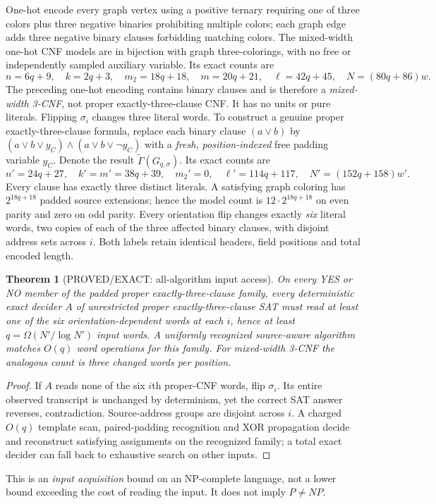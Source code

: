 \documentclass[11pt]{article}
\newtheorem{theorem}{Theorem}
\begin{document}
One-hot encode every graph vertex using a positive ternary requiring one of three colors plus three negative binaries prohibiting multiple colors; each graph edge adds three negative binary clauses forbidding matching colors. The mixed-width one-hot CNF models are in bijection with graph three-colorings, with no free or independently sampled auxiliary variable. Its exact counts are
\[
n=6q+9,\quad k=2q+3,\quad m_2=18q+18,\quad
m=20q+21,\quad \ell=42q+45,\quad N=(80q+86)w.
\]
The preceding one-hot encoding contains binary clauses and is therefore a
\emph{mixed-width 3-CNF}, not proper exactly-three-clause CNF. It has no
units or pure literals. Flipping $\sigma_i$ changes three literal words.
To construct a genuine proper exactly-three-clause formula, replace each
binary clause $(a\vee b)$ by $(a\vee b\vee y_C)\wedge
(a\vee b\vee\neg y_C)$ with a \emph{fresh, position-indexed}
free padding variable $y_C$. Denote the result
$\widetilde{\Gamma}(G_{q,\sigma})$. Its exact counts are
\[
n'=24q+27,\quad k'=m'=38q+39,\quad m_2'=0,\quad
\ell'=114q+117,\quad N'=(152q+158)w'.
\]
Every clause has exactly three distinct literals. A satisfying
graph coloring has $2^{18q+18}$ padded source extensions; hence
the model count is $12\cdot 2^{18q+18}$ on even parity and zero
on odd parity. Every orientation flip changes exactly \emph{six}
literal words, two copies of each of the three affected binary
clauses, with disjoint address sets across $i$. Both labels
retain identical headers, field positions and total encoded length.
\begin{theorem}[PROVED/EXACT: all-algorithm input access]
On every YES or NO member of the padded proper exactly-three-clause family, every deterministic exact decider $A$ of \emph{unrestricted} proper exactly-three-clause SAT must read at least one of the six orientation-dependent words at each $i$, hence at least $q=\Omega(N'/\log N')$ input words. A uniformly recognized source-aware algorithm matches $O(q)$ word operations for this family. For mixed-width 3-CNF the analogous count is three changed words per position.
\end{theorem}
\begin{proof}
If $A$ reads none of the six $i$th proper-CNF words, flip $\sigma_i$. Its entire observed transcript is unchanged by determinism, yet the correct SAT answer reverses, contradiction. Source-address groups are disjoint across $i$. A charged $O(q)$ template scan, paired-padding recognition and XOR propagation decide and reconstruct satisfying assignments on the recognized family; a total exact decider can fall back to exhaustive search on other inputs.
\end{proof}
This is an \emph{input acquisition} bound on an NP-complete language, not a lower bound exceeding the cost of reading the input. It does not imply $P\ne NP$.
\end{document}
